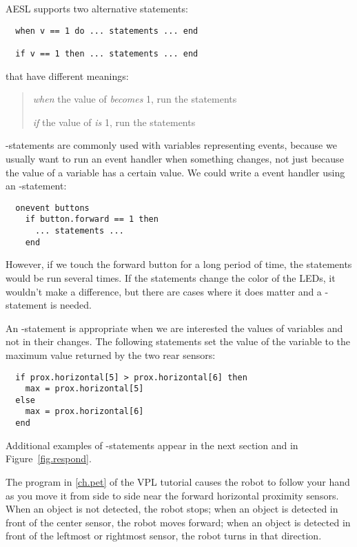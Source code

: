 AESL supports two alternative statements:
\begin{footnotesize}
\begin{verbatim}
  when v == 1 do ... statements ... end

  if v == 1 then ... statements ... end
\end{verbatim}
\end{footnotesize}
that have different meanings:
\begin{quote}
\emph{when} the value of  \emph{becomes} 1, run the statements

\emph{if} the value of  \emph{is} 1, run the statements
\end{quote}

-statements are commonly used with variables representing
events, because we usually want to run an event handler when something
changes, not just because the value of a variable has a certain value.
We could write a  event handler using an -statement:

\begin{footnotesize}
\begin{verbatim}
  onevent buttons
    if button.forward == 1 then
      ... statements ...
    end
\end{verbatim}
\end{footnotesize}
However, if we touch the forward button for a long period of time,
the statements would be run several times. If the statements change the
color of the LEDs, it wouldn't make a difference, but there are cases
where it does matter and a -statement is needed.

An -statement is appropriate when we are interested the values of
variables and not in their changes. The following statements set the
value of the variable  to the maximum value returned by the two
rear sensors:

\begin{footnotesize}
\begin{verbatim}
  if prox.horizontal[5] > prox.horizontal[6] then
    max = prox.horizontal[5]
  else
    max = prox.horizontal[6]
  end
\end{verbatim}
\end{footnotesize}

Additional examples of -statements appear in the next section and
in Figure~\ref{fig.respond}.


\newpage


The program  in \cref{ch.pet} of the VPL tutorial causes the
robot to follow your hand as you move it from side to side near the
forward horizontal proximity sensors.
When an object is not detected, the robot stops; when an object is
detected in front of the center sensor, the robot moves forward; when an
object is detected in front of the leftmost or rightmost sensor, the
robot turns in that direction.

